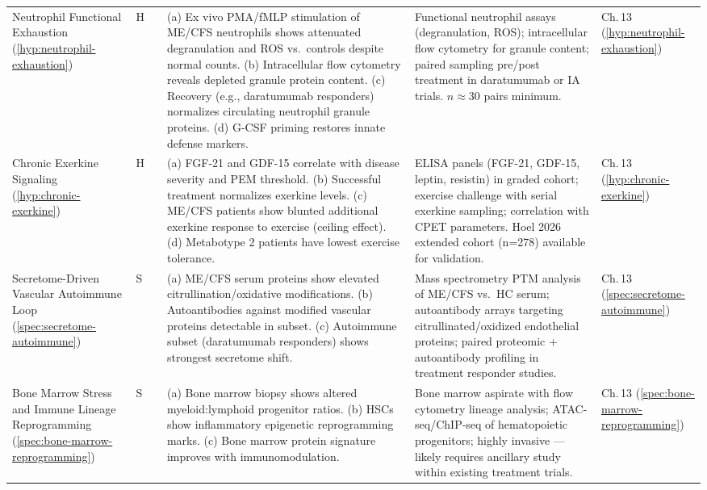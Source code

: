 \begin{longtable}{%
  p{3.0cm}
  >{\centering\arraybackslash}p{0.55cm}
  >{\centering\arraybackslash}p{1.0cm}
  p{3.8cm}
  p{3.8cm}
  p{2.2cm}
}
Neutrophil Functional Exhaustion
(\ref{hyp:neutrophil-exhaustion})
& H & 0.40 &
(a) Ex vivo PMA/fMLP stimulation of ME/CFS neutrophils shows attenuated degranulation and ROS vs.\ controls despite normal counts.
(b) Intracellular flow cytometry reveals depleted granule protein content.
(c) Recovery (e.g., daratumumab responders) normalizes circulating neutrophil granule proteins.
(d) G-CSF priming restores innate defense markers.
&
Functional neutrophil assays (degranulation, ROS);
intracellular flow cytometry for granule content;
paired sampling pre/post treatment in daratumumab or IA trials.
$n \approx 30$ pairs minimum.
&
Ch.\,13 (\ref{hyp:neutrophil-exhaustion}) \\[6pt]

Chronic Exerkine Signaling
(\ref{hyp:chronic-exerkine})
& H & 0.45 &
(a) FGF-21 and GDF-15 correlate with disease severity and PEM threshold.
(b) Successful treatment normalizes exerkine levels.
(c) ME/CFS patients show blunted additional exerkine response to exercise (ceiling effect).
(d) Metabotype 2 patients have lowest exercise tolerance.
&
ELISA panels (FGF-21, GDF-15, leptin, resistin) in graded cohort;
exercise challenge with serial exerkine sampling;
correlation with CPET parameters.
Hoel 2026 extended cohort (n=278) available for validation.
&
Ch.\,13 (\ref{hyp:chronic-exerkine}) \\[6pt]

Secretome-Driven Vascular Autoimmune Loop
(\ref{spec:secretome-autoimmune})
& S & 0.25 &
(a) ME/CFS serum proteins show elevated citrullination/oxidative modifications.
(b) Autoantibodies against modified vascular proteins detectable in subset.
(c) Autoimmune subset (daratumumab responders) shows strongest secretome shift.
&
Mass spectrometry PTM analysis of ME/CFS vs.\ HC serum;
autoantibody arrays targeting citrullinated/oxidized endothelial proteins;
paired proteomic + autoantibody profiling in treatment responder studies.
&
Ch.\,13 (\ref{spec:secretome-autoimmune}) \\[6pt]

Bone Marrow Stress and Immune Lineage Reprogramming
(\ref{spec:bone-marrow-reprogramming})
& S & 0.20 &
(a) Bone marrow biopsy shows altered myeloid:lymphoid progenitor ratios.
(b) HSCs show inflammatory epigenetic reprogramming marks.
(c) Bone marrow protein signature improves with immunomodulation.
&
Bone marrow aspirate with flow cytometry lineage analysis;
ATAC-seq/ChIP-seq of hematopoietic progenitors;
highly invasive --- likely requires ancillary study within existing treatment trials.
&
Ch.\,13 (\ref{spec:bone-marrow-reprogramming}) \\[6pt]


\end{longtable}
